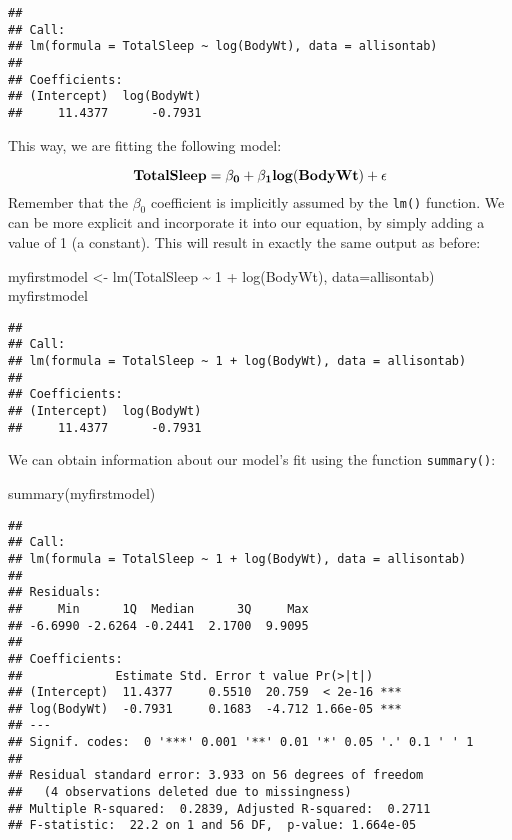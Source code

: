 \documentclass[
]{book}
\newenvironment{Shaded}{\begin{snugshade}}{\end{snugshade}}
\newcommand{\AttributeTok}[1]{\textcolor[rgb]{0.77,0.63,0.00}{#1}}
\newcommand{\DecValTok}[1]{\textcolor[rgb]{0.00,0.00,0.81}{#1}}
\newcommand{\FunctionTok}[1]{\textcolor[rgb]{0.00,0.00,0.00}{#1}}
\newcommand{\NormalTok}[1]{#1}
\newcommand{\OtherTok}[1]{\textcolor[rgb]{0.56,0.35,0.01}{#1}}
\newcommand{\SpecialCharTok}[1]{\textcolor[rgb]{0.00,0.00,0.00}{#1}}
\begin{document}
\begin{verbatim}
## 
## Call:
## lm(formula = TotalSleep ~ log(BodyWt), data = allisontab)
## 
## Coefficients:
## (Intercept)  log(BodyWt)  
##     11.4377      -0.7931
\end{verbatim}

This way, we are fitting the following model:

\[\bf{TotalSleep} = \beta_0 + \beta_1 \bf{log(BodyWt)} + \bf{\epsilon}\] Remember that the \(\beta_0\) coefficient is implicitly assumed by the \texttt{lm()} function. We can be more explicit and incorporate it into our equation, by simply adding a value of 1 (a constant). This will result in exactly the same output as before:

\begin{Shaded}
\begin{Highlighting}[]
\NormalTok{myfirstmodel }\OtherTok{\textless{}{-}} \FunctionTok{lm}\NormalTok{(TotalSleep }\SpecialCharTok{\textasciitilde{}} \DecValTok{1} \SpecialCharTok{+} \FunctionTok{log}\NormalTok{(BodyWt), }\AttributeTok{data=}\NormalTok{allisontab)  }
\NormalTok{myfirstmodel}
\end{Highlighting}
\end{Shaded}

\begin{verbatim}
## 
## Call:
## lm(formula = TotalSleep ~ 1 + log(BodyWt), data = allisontab)
## 
## Coefficients:
## (Intercept)  log(BodyWt)  
##     11.4377      -0.7931
\end{verbatim}

We can obtain information about our model's fit using the function \texttt{summary()}:

\begin{Shaded}
\begin{Highlighting}[]
\FunctionTok{summary}\NormalTok{(myfirstmodel)}
\end{Highlighting}
\end{Shaded}

\begin{verbatim}
## 
## Call:
## lm(formula = TotalSleep ~ 1 + log(BodyWt), data = allisontab)
## 
## Residuals:
##     Min      1Q  Median      3Q     Max 
## -6.6990 -2.6264 -0.2441  2.1700  9.9095 
## 
## Coefficients:
##             Estimate Std. Error t value Pr(>|t|)    
## (Intercept)  11.4377     0.5510  20.759  < 2e-16 ***
## log(BodyWt)  -0.7931     0.1683  -4.712 1.66e-05 ***
## ---
## Signif. codes:  0 '***' 0.001 '**' 0.01 '*' 0.05 '.' 0.1 ' ' 1
## 
## Residual standard error: 3.933 on 56 degrees of freedom
##   (4 observations deleted due to missingness)
## Multiple R-squared:  0.2839, Adjusted R-squared:  0.2711 
## F-statistic:  22.2 on 1 and 56 DF,  p-value: 1.664e-05
\end{verbatim}
\end{document}
